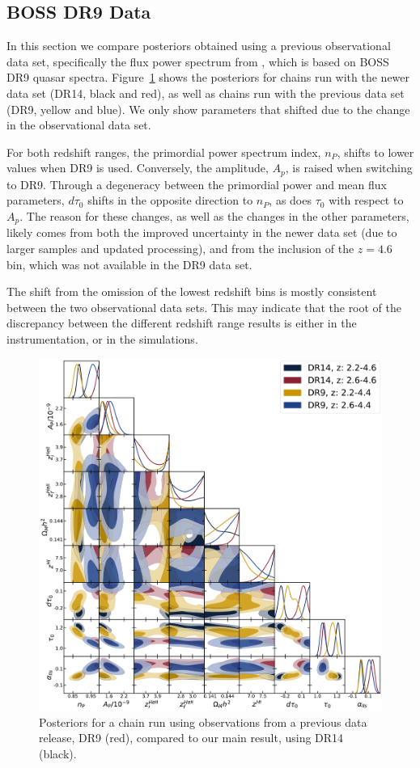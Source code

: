 \documentclass[a4paper,11pt]{article}
\begin{document}
\subsection{BOSS DR9 Data}\label{sec:dr9_results}

In this section we compare posteriors obtained using a previous observational data set, specifically the flux power spectrum from \cite{2013A&A...559A..85P}, which is based on BOSS DR9 quasar spectra.
Figure~\ref{fig:dr9_corner} shows the posteriors for chains run with the newer data set (DR14, black and red), as well as chains run with the previous data set (DR9, yellow and blue).
We only show parameters that shifted due to the change in the observational data set.

For both redshift ranges, the primordial power spectrum index, $n_P$, shifts to lower values when DR9 is used.
Conversely, the amplitude, $A_p$, is raised when switching to DR9.
Through a degeneracy between the primordial power and mean flux parameters, $d\tau_0$ shifts in the opposite direction to $n_P$, as does $\tau_0$ with respect to $A_p$.
The reason for these changes, as well as the changes in the other parameters, likely comes from both the improved uncertainty in the newer data set (due to larger samples and updated processing), and from the inclusion of the $z=4.6$ bin, which was not available in the DR9 data set.

The shift from the omission of the lowest redshift bins is mostly consistent between the two observational data sets.
This may indicate that the root of the discrepancy between the different redshift range results is either in the instrumentation, or in the simulations.

\begin{figure}
    \centering
    \includegraphics[width=\textwidth]{figures/dr9.pdf}
    \caption{\label{fig:dr9_corner}
    Posteriors for a chain run using observations from a previous data release, DR9 (red), compared to our main result, using DR14 (black).
    }
\end{figure}
\end{document}
